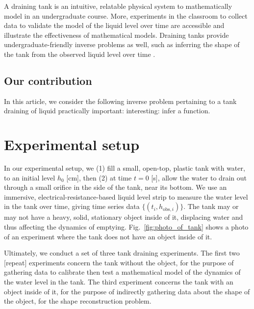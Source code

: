 \documentclass[openacc]{rsproca_new}%
\begin{document}

A draining tank is an intuitive, relatable physical system to mathematically model in an undergraduate course. 
More, experiments in the classroom to collect data to validate the model of the liquid level over time are accessible and illustrate the effectiveness of mathematical models.
\cite{farmer1992physical,driver1998torricelli,brady2009siphons,rother2024modelling,paldy1963apparatus,ivanov2014testing,williams2021vessel,pavesi2019investigating,planinvsivc2011holes,saleta2005experimental,lopac2015water,powell2012carrying}
Draining tanks provide undergraduate-friendly inverse problems \cite{groetsch1993inverse,neto2012introduction,tarantola2005inverse} as well, such as inferring the shape of the tank from the observed liquid level over time \cite{groetsch1993inverse,groetsch1999inverse}. 

\subsection{Our contribution}
In this article, we consider the following inverse problem pertaining to a tank draining of liquid
practically important:
interesting: infer a function. 


\section{Experimental setup} \label{sec:expt}
In our experimental setup, we (1) fill a small, open-top, plastic tank with water, to an initial level $h_0$ [cm], then (2) at time $t=0$ [s], allow the water to drain out through a small orifice in the side of the tank, near its bottom. 
We use an immersive, electrical-resistance-based liquid level strip to measure the water level in the tank over time, giving time series data $\{(t_i, h_{\text{obs}, i}) \}$. The tank may or may not have a heavy, solid, stationary object inside of it, displacing water and thus affecting the dynamics of emptying. Fig.~\ref{fig:photo_of_tank} shows a photo of an experiment where the tank does not have an object inside of it.

Ultimately, we conduct a set of three tank draining experiments. The first two [repeat] experiments concern the tank without the object, for the purpose of gathering data to calibrate then test a mathematical model of the dynamics of the water level in the tank. The third experiment concerns the tank with an object inside of it, for the purpose of indirectly gathering data about the shape of the object, for the shape reconstruction problem.
\end{document}
